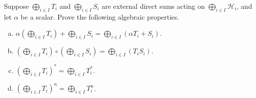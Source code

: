 \documentclass[10pt]{mypackage}
\begin{document}
\begin{exercise}
  Suppose $\bigoplus_{i\in I}T_i$ and $\bigoplus_{i\in I}S_i$ are external direct sums acting on $\bigoplus_{i\in I}\mathcal{H}_i$, and let $\alpha$ be a scalar. Prove the following algebraic properties.
  \begin{enumerate}[(a)]
    \item $\displaystyle \alpha \left(\bigoplus_{i\in I}T_i\right) + \bigoplus_{i\in I}S_i = \bigoplus_{i\in I}\left(\alpha T_i + S_i\right)$.
    \item $\displaystyle \left(\bigoplus_{i\in I}T_i\right) \circ \left(\bigoplus_{i\in I}S_i\right) = \bigoplus_{i\in I}\left(T_iS_i\right)$.
    \item $\displaystyle \left(\bigoplus_{i\in I}T_i\right)^{\ast}= \bigoplus_{i\in I}T_i^{\ast}$.
    \item $\displaystyle \left(\bigoplus_{i\in I}T_i\right)^{n}= \bigoplus_{i\in I}T_i^{n}$.
  \end{enumerate}
\end{exercise}
\end{document}
